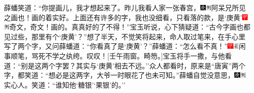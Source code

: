薛蟠笑道：``你提画儿，我才想起来了。昨儿我看人家一张春宫，{\includegraphics[width=3mm]{../Images/00004}\includegraphics[width=3mm]{../Images/00011}\footnotesize \kaishu 阿呆兄所见之画也！}画的着实好。上面还有许多的字，我也没细看，只看落的款，是`庚黄'{\includegraphics[width=3mm]{../Images/00002}\includegraphics[width=3mm]{../Images/00011}\footnotesize \kaishu 奇文，奇文！}画的。真真好的了不得！''宝玉听说，心下猜疑道：``古今字画也都见过些，那里有个`庚黄'？''想了半天，不觉笑将起来，命人取过笔来，在手心里写了两个字，又问薛蟠道：``你看真了是`庚黄'？''薛蟠道：``怎么看不真！''{\includegraphics[width=3mm]{../Images/00002}\includegraphics[width=3mm]{../Images/00010}\footnotesize \kaishu 闲事顺笔，骂死不学之纨绔。叹叹！{[}壬午雨窗。畸笏。{]}}宝玉将手一撒，与他看道：``别是这两个字罢？其实与`庚黄'相去不远。''众人都看时，原来是``唐寅''两个字，都笑道：``想必是这两字，大爷一时眼花了也未可知。''薛蟠自觉没意思，{\includegraphics[width=3mm]{../Images/00004}\includegraphics[width=3mm]{../Images/00011}\footnotesize \kaishu 实心人。}笑道：``谁知他`糖银'`果银'的。''

